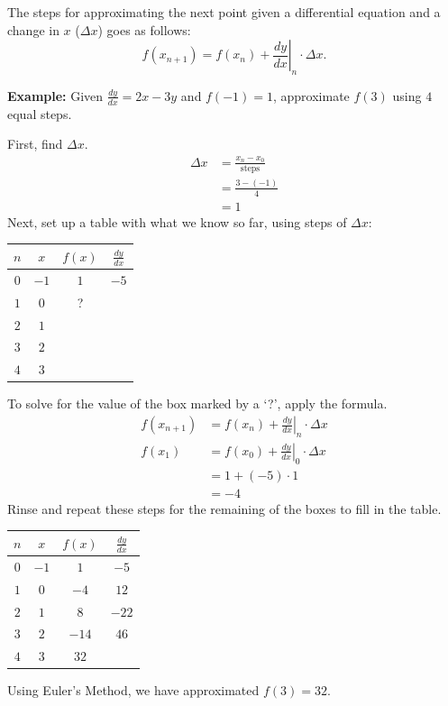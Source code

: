 \documentclass[12pt]{article}
\begin{document}
The steps for approximating the next point given a differential equation and a change in $x$ ($\Delta x$) goes as follows:
\[ f(x_{n+1}) = f(x_n) + \left. \frac{dy}{dx} \right \vert_n \cdot \Delta x. \]

\noindent \textbf{Example:} Given $\frac{dy}{dx} = 2x-3y$ and $f(-1) = 1$, approximate $f(3)$ using $4$ equal steps.

\noindent First, find $\Delta x$.
\begin{align*}
    \Delta x & = \frac{x_n - x_0}{\text{steps}} \\[6pt]
             & = \frac{3-(-1)}{4}               \\[6pt]
             & = 1
\end{align*}
Next, set up a table with what we know so far, using steps of $\Delta x$:
\begin{center}
    \begin{tabular}{|c|c|c|c|}
        \hline
        $n$ & $x$  & $f(x)$ & $\frac{dy}{dx}$ \\
        \hline \hline
        $0$ & $-1$ & $1$    & $-5$            \\
        \hline
        $1$ & $0$  & ?      &                 \\
        \hline
        $2$ & $1$  &        &                 \\
        \hline
        $3$ & $2$  &        &                 \\
        \hline
        $4$ & $3$  &        &                 \\
        \hline
    \end{tabular}
\end{center}
To solve for the value of the box marked by a `?', apply the formula.
\begin{align*}
    f(x_{n+1}) & = f(x_n) + \left. \frac{dy}{dx} \right \vert_n \cdot \Delta x \\[6pt]
    f(x_1)     & = f(x_0) + \left. \frac{dy}{dx} \right \vert_0 \cdot \Delta x \\[6pt]
               & = 1 + (-5) \cdot 1                                            \\
               & = -4
\end{align*}
Rinse and repeat these steps for the remaining of the boxes to fill in the table.
\begin{center}
    \begin{tabular}{|c|c|c|c|}
        \hline
        $n$ & $x$  & $f(x)$ & $\frac{dy}{dx}$ \\
        \hline \hline
        $0$ & $-1$ & $1$    & $-5$            \\
        \hline
        $1$ & $0$  & $-4$   & $12$            \\
        \hline
        $2$ & $1$  & $8$    & $-22$           \\
        \hline
        $3$ & $2$  & $-14$  & $46$            \\
        \hline
        $4$ & $3$  & $32$   &                 \\
        \hline
    \end{tabular}
\end{center}
Using Euler's Method, we have approximated $f(3) = 32$.
\end{document}
